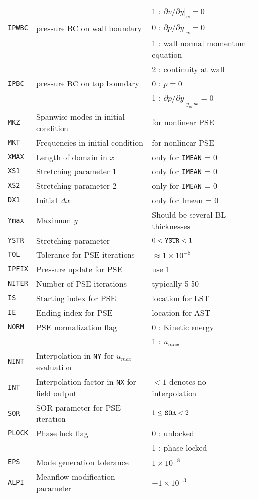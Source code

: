 \documentclass[10pt]{article}
\newcommand{\pse}{\textsf{PSE}\xspace}
\newcommand{\lst}{\textsf{LST}\xspace}
\renewcommand{\ast}{\textsf{AST}\xspace}
\begin{document}
\begin{longtable}[c]{|l|l|l|}
& & 1 : $\partial v/\partial y|_w = 0$ \\
{\tt IPWBC} & pressure BC on wall boundary & 0 : 
$\partial p/\partial y|_w = 0$ \\
& & 1 : wall normal momentum equation \\
& & 2 : continuity at wall \\
{\tt IPBC} & pressure BC on top boundary & 0 :  $p = 0$ \\
& & 1 : $\partial p/\partial y|_{y_max} = 0$ \\
{\tt MKZ} & Spanwise modes in initial condition & for nonlinear \pse \\
{\tt MKT} & Frequencies in initial condition & for nonlinear \pse \\
{\tt XMAX} & Length of domain in $x$ & only for {\tt IMEAN} = 0 \\
{\tt XS1} & Stretching parameter 1 & only for {\tt IMEAN} = 0 \\
{\tt XS2} & Stretching parameter 2 & only for {\tt IMEAN} = 0 \\
{\tt DX1} & Initial $\Delta x$ & only for Imean = 0 \\
{\tt Ymax} & Maximum $y$ & Should be several BL thicknesses \\
{\tt YSTR} & Stretching parameter & $ 0 < {\tt YSTR} < 1 $ \\
{\tt TOL} & Tolerance for \pse iterations & $\approx 1 \times 10^{-8}$ \\
{\tt IPFIX} & Pressure update for \pse & use 1 \\
{\tt NITER} & Number of \pse iterations& typically 5-50\\
{\tt IS} & Starting index for \pse & location for \lst \\
{\tt IE} & Ending index for \pse & location for \ast \\
{\tt NORM} & \pse normalization flag & 0 : Kinetic energy \\
& & 1 : $u_{max}$ \\
{\tt NINT} & Interpolation in {\tt NY} for $u_{max}$ evaluation & \\
{\tt INT} & Interpolation factor in {\tt NX} for field output & 
$< 1$ denotes no interpolation \\
{\tt SOR} & SOR parameter for \pse iteration & $1 \le {\tt SOR} < 2$ \\
{\tt PLOCK} & Phase lock flag & 0 : unlocked \\
& & 1 : phase locked \\
{\tt EPS} & Mode generation tolerance & $1\times 10^{-8}$ \\
{\tt ALPI} & Meanflow modification parameter & $-1\times 10^{-3}$ \\
\end{longtable}
\end{document}
